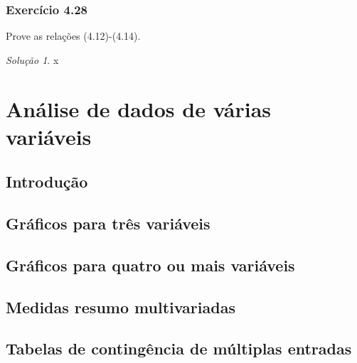 \documentclass[
]{latex/krantz}
\theoremstyle{definition}
\theoremstyle{definition}
\theoremstyle{definition}
\theoremstyle{definition}
\theoremstyle{remark}
\newtheorem*{solution}{Solução}
\begin{document}
\hypertarget{exr4-28}{%
\subsection*{Exercício 4.28}\label{exr4-28}}

Prove as relações (4.12)-(4.14).

\begin{solution}
x
\end{solution}

\hypertarget{anuxe1lise-de-dados-de-vuxe1rias-variuxe1veis}{%
\chapter{Análise de dados de várias variáveis}\label{anuxe1lise-de-dados-de-vuxe1rias-variuxe1veis}}

\hypertarget{introduuxe7uxe3o-3}{%
\section{Introdução}\label{introduuxe7uxe3o-3}}

\hypertarget{gruxe1ficos-para-truxeas-variuxe1veis}{%
\section{Gráficos para três variáveis}\label{gruxe1ficos-para-truxeas-variuxe1veis}}

\hypertarget{gruxe1ficos-para-quatro-ou-mais-variuxe1veis}{%
\section{Gráficos para quatro ou mais variáveis}\label{gruxe1ficos-para-quatro-ou-mais-variuxe1veis}}

\hypertarget{medidas-resumo-multivariadas}{%
\section{Medidas resumo multivariadas}\label{medidas-resumo-multivariadas}}

\hypertarget{tabelas-de-continguxeancia-de-muxfaltiplas-entradas}{%
\section{Tabelas de contingência de múltiplas entradas}\label{tabelas-de-continguxeancia-de-muxfaltiplas-entradas}}
\end{document}
